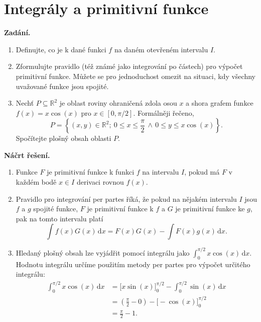 \section{Integrály a primitivní funkce}

\noindent\textbf{Zadání.}\par
\begin{enumerate}
  \item Definujte, co je  k dané funkci $f$ na daném otevřeném intervalu $I$.
  \item Zformulujte pravidlo  (též známé jako integrování po částech) pro výpočet primitivní funkce. Můžete se pro jednoduchost omezit na situaci, kdy všechny uvažované funkce jsou spojité.
  \item Nechť $P \subseteq \mathbb{R}^2$ je oblast roviny ohraničená zdola osou $x$ a shora grafem funkce $f(x) = x \cos(x)$ pro $x \in [0, \pi/2]$. Formálněji řečeno,
    \[
      P = \left\{ (x, y) \in \mathbb{R}^2 ;\ 0 \leq x \leq \frac{\pi}{2} \,\wedge\, 0 \leq y \leq x \cos(x) \right\}.
    \]
    Spočítejte plošný obsah oblasti $P$.
\end{enumerate}

\medskip
\noindent\textbf{Náčrt řešení.}\par
\begin{enumerate}
  \item Funkce $F$ je primitivní funkce k funkci $f$ na intervalu $I$, pokud má $F$ v každém bodě $x \in I$ derivaci rovnou $f(x)$.
  \item Pravidlo pro integrování per partes říká, že pokud na nějakém intervalu $I$ jsou $f$ a $g$ spojité funkce, $F$ je primitivní funkce k $f$ a $G$ je primitivní funkce ke $g$, pak na tomto intervalu platí
    \[
      \int f(x) G(x)\,\mathrm{d}x = F(x) G(x) - \int F(x) g(x)\,\mathrm{d}x.
    \]
  \item Hledaný plošný obsah lze vyjádřit pomocí integrálu jako $\int_0^{\pi/2} x \cos(x)\,\mathrm{d}x$. Hodnotu integrálu určíme použitím metody per partes pro výpočet určitého integrálu:
    \begin{align*}
      \int_0^{\pi/2} x \cos(x)\,\mathrm{d}x
        &= \bigl[x \sin(x)\bigr]_0^{\pi/2} - \int_0^{\pi/2} \sin(x)\,\mathrm{d}x \\
        &= \left(\frac{\pi}{2} - 0\right) - \bigl[-\cos(x)\bigr]_0^{\pi/2} \\
        &= \frac{\pi}{2} - 1.
    \end{align*}
\end{enumerate}
